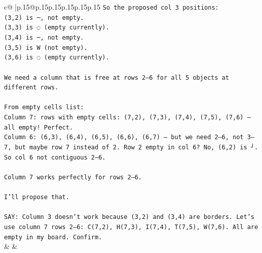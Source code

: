 \documentclass{article}
\begin{document}
{\begin{supertabular}{c@{$\;$}|p{.15\linewidth}@{}p{.15\linewidth}p{.15\linewidth}p{.15\linewidth}p{.15\linewidth}p{.15\linewidth}}
{{{\texttt{So the proposed col 3 positions:  } \\
\texttt{(3,2) is ─, not empty.  } \\
\texttt{(3,3) is ◌ (empty currently).  } \\
\texttt{(3,4) is ─, not empty.  } \\
\texttt{(3,5) is W (not empty).  } \\
\texttt{(3,6) is ◌ (empty currently).} \\
\\ 
\texttt{We need a column that is free at rows 2–6 for all 5 objects at different rows.} \\
\\ 
\texttt{From empty cells list:  } \\
\texttt{Column 7: rows with empty cells: (7,2), (7,3), (7,4), (7,5), (7,6) — all empty! Perfect.  } \\
\texttt{Column 6: (6,3), (6,4), (6,5), (6,6), (6,7) — but we need 2–6, not 3–7, but maybe row 7 instead of 2. Row 2 empty in col 6? No, (6,2) is ┘. So col 6 not contiguous 2–6.} \\
\\ 
\texttt{Column 7 works perfectly for rows 2–6.} \\
\\ 
\texttt{I'll propose that.} \\
\\ 
\texttt{SAY: Column 3 doesn't work because (3,2) and (3,4) are borders. Let's use column 7 rows 2–6: C(7,2), H(7,3), I(7,4), T(7,5), W(7,6). All are empty in my board. Confirm.} \\
            }
        }
    }
    & & \\ \\


\end{supertabular}}
\end{document}
